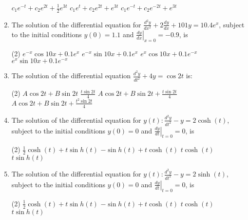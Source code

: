\begin{enumerate}
\begin{tasks}
		\task[\textbf{b.}]$c_{1} e^{-t}+c_{2} e^{2 t}+\frac{1}{2} e^{3 t}$
		\task[\textbf{c.}]$c_{1} e^{t}+c_{2} e^{2 t}+e^{3 t}$
		\task[\textbf{d.}] $c_{1} e^{-t}+c_{2} e^{-2 t}+e^{3 t}$
	\end{tasks}
	\item The solution of the differential equation for $\frac{d^{2} y}{d x^{2}}+2 \frac{d y}{d x}+101 y=10.4 e^{x}$, subject to the initial conditions $y(0)=1.1$ and $\left.\frac{d y}{d x}\right|_{x=0}=-0.9$, is
	 \begin{tasks}(2)
		\task[\textbf{a.}]$e^{-x} \cos 10 x+0.1 e^{x}$
		\task[\textbf{b.}]$e^{-x} \sin 10 x+0.1 e^{x}$
		\task[\textbf{c.}]$e^{x} \cos 10 x+0.1 e^{-x}$
		\task[\textbf{d.}] $e^{x} \sin 10 x+0.1 e^{-x}$
	\end{tasks}
	\item The solution of the differential equation $\frac{d^{2} y}{d t^{2}}+4 y=\cos 2 t$ is:
	 \begin{tasks}(2)
		\task[\textbf{a.}] $A \cos 2 t+B \sin 2 t$
		\task[\textbf{b.}] $\frac{t \sin 2 t}{4}$
		\task[\textbf{c.}]$A \cos 2 t+B \sin 2 t+\frac{t \sin 2 t}{4}$
		\task[\textbf{d.}] $A \cos 2 t+B \sin 2 t+\frac{t^{2} \sin 2 t}{4}$
	\end{tasks}
	\item The solution of the differential equation for $y(t): \frac{d^{2} y}{d t^{2}}-y=2 \cosh (t)$, subject to the initial conditions $y(0)=0$ and $\left.\frac{d y}{d t}\right|_{t=0}=0$, is
	 \begin{tasks}(2)
		\task[\textbf{a.}]$\frac{1}{2} \cosh (t)+t \sin h(t)$
		\task[\textbf{b.}]$-\sin h(t)+t \cosh (t)$
		\task[\textbf{c.}] $t \cosh (t)$
		\task[\textbf{d.}] $t \sin h(t)$
	\end{tasks}
	\item The solution of the differential equation for $y(t): \frac{d^{2} y}{d t^{2}}-y=2 \sinh (t)$, subject to the initial conditions $y(0)=0$ and $\left.\frac{d y}{d t}\right|_{t=0}=0$, is
	 \begin{tasks}(2)
		\task[\textbf{a.}] $\frac{1}{2} \cosh (t)+t \sin h(t)$
		\task[\textbf{b.}]$-\sin h(t)+t \cosh (t)$
		\task[\textbf{c.}]$t \cosh (t)$
		\task[\textbf{d.}] $t \sin h(t)$
	\end{tasks}
\end{enumerate}
